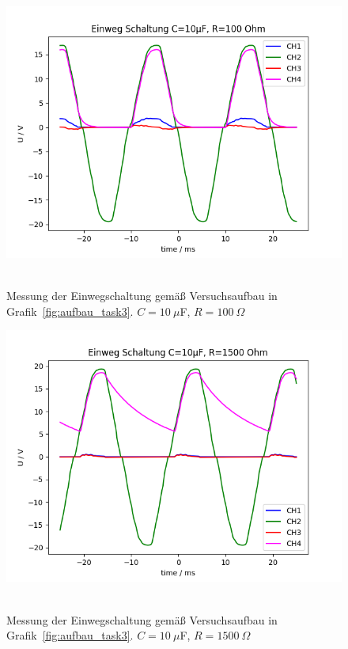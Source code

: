 \documentclass{article}
\begin{document}
\begin{figure}[H]
\caption{Messung der Einwegschaltung gemäß Versuchsaufbau in Grafik~\ref{fig:aufbau_task3}. $C=10~\mu$F, $R=100~\Omega$}
\label{fig:grafik_task3_10_100}
{\centering
\includegraphics[scale=0.6]{bilder/task3_10mu_R100.png}
~
}
\end{figure}

\begin{figure}[H]
\caption{Messung der Einwegschaltung gemäß Versuchsaufbau in Grafik~\ref{fig:aufbau_task3}. $C=10~\mu$F, $R=1500~\Omega$}
\label{fig:grafik_task3_10_1500}
{\centering
\includegraphics[scale=0.6]{bilder/task3_10mu_R1500.png}
~
}
\end{figure}
\end{document}
